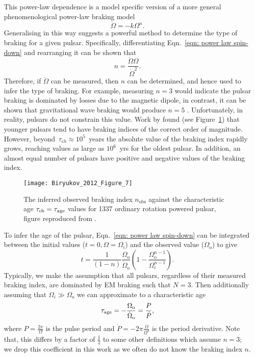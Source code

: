 This power-law dependence is a model specific version of a more general
phenomenological power-law braking model
\begin{equation}
    \dot{\Omega} = -k \Omega^{n}.
    \label{eqn: power law spin-down}
\end{equation}
Generalising in this way suggests a powerful method to determine the type of
braking for a given pulsar. Specifically, differentiating Eqn.~\eqref{eqn: power law spin-down}
and rearranging it can be shown that
\begin{equation}
    n = \frac{\ddot{\Omega}\Omega}{\dot{\Omega}^{2}}.
    \label{eqn: measured braking index}
\end{equation}
Therefore, if $\ddot{\Omega}$ can be measured, then $n$ can be determined, and
hence used to infer the type of braking. For example, measuring $n=3$ would
indicate the pulsar braking is dominated by losses due to the magnetic dipole,
in contrast, it can be shown that gravitational wave braking would produce
$n=5$ \citep{Shapiro83}. Unfortunately, in reality, pulsars do not constrain this
value. Work by \citet{Biryukov2012} found (see Figure~\ref{fig: biryukov}) that
younger pulsars tend to have braking indices of the correct order of
magnitude. However, beyond~$\tau_{ch}\approx10^{5}$~years
the absolute value of the braking index rapidly grows,
reaching values as large as $10^{6}$~yrs for the oldest pulsar. In addition, an
almost equal number of pulsars have positive and negative values of the braking
index.
\begin{figure}[htb]
\centering
\texttt{[image: Biryukov\_2012\_Figure\_7]}
\caption{The inferred observed braking index $n_{\textrm{obs}}$ against the
characteristic age $\tau_{\textrm{ch}}=\tau_{\mathrm{age}}$ values for 1337 ordinary
rotation powered pulsar, figure reproduced from \citet{Biryukov2012}.}
\label{fig: biryukov}
\end{figure}

To infer the age of the pulsar, Eqn.~\eqref{eqn: power law spin-down} can
be integrated between the initial values ($t=0, \Omega=\Omega_{i}$) and the
observed value ($\Omega_{\mathrm{o}}$) to give
\begin{equation}
    t = \frac{1}{(1-n)} \frac{\Omega_{\mathrm{o}}}{\dot\Omega_{\mathrm{o}}} 
        \left(1 - \frac{\Omega_{\mathrm{o}}^{n-1}}{\Omega_{i}^{n-1}}\right).
\label{eqn: characteristic age}
\end{equation}
Typically, we make the assumption that all
pulsars, regardless of their measured braking index, are dominated by EM braking
such that $N=3$. Then additionally assuming that $\Omega_{i} \gg
\Omega_{\mathrm{o}}$ we can approximate to a characteristic age
\begin{equation}
    \tau_{\mathrm{age}} = -\frac{\Omega_{\mathrm{o}}}{\dot\Omega_{\mathrm{o}}}
         = \frac{P}{\dot{P}},
\label{eqn: tauAge definition}
\end{equation}
where $P=\frac{2\pi}{\Omega}$ is the pulse period and
$\dot{P}=-2\pi\frac{\dot{\Omega}}{\Omega^{2}}$ is the period derivative.  Note
that, this differs by a factor of $\frac{1}{2}$ to some other definitions which
assume $n=3$; we drop this coefficient in this work as we often do not know the
braking index $n$.

